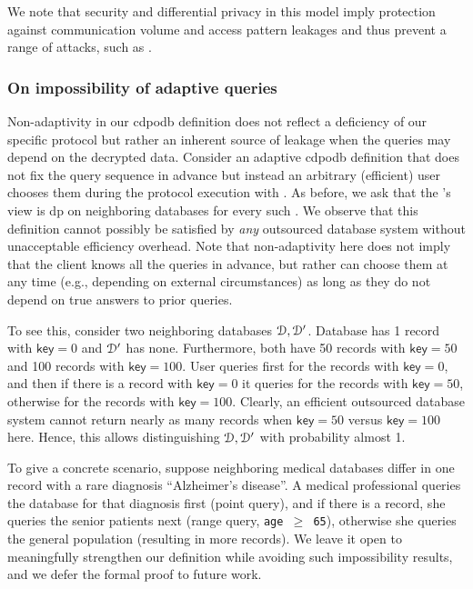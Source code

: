	\begin{remark}[Informal]
		We note that security and differential privacy in this model imply protection against communication volume and access pattern leakages and thus prevent a range of attacks, such as \cite{leakage-abuse-attacks-cash-15,inference-attacks-naveed-15,generic-attacks-kellaris}. %
	\end{remark}

	\subsubsection{On impossibility of adaptive queries}\label{section:dpodb:adversarial-models:adaptive}

		Non-adaptivity in our \acrshort{cdpodb} definition does not reflect a deficiency of our specific protocol but rather an inherent source of leakage when the queries may depend on the decrypted data.
		Consider an adaptive \acrshort{cdpodb} definition that does not fix the query sequence  in advance but instead an arbitrary (efficient) user \user{} chooses them during the protocol execution with \server{}.
		As before, we ask that the \server{}'s view is \acrshort{dp} on neighboring databases for every such \user{}.
		We observe that this definition cannot possibly be satisfied by \emph{any} outsourced database system without unacceptable efficiency overhead.
		Note that non-adaptivity here does not imply that the client knows all the queries in advance, but rather can choose them at any time (e.g., depending on external circumstances) as long as they do not depend on true answers to prior queries.

		To see this, consider two neighboring databases $\mathcal{D}, \mathcal{D}^\prime$.
		Database \database{} has 1 record with $\mathsf{key} = 0$ and $\mathcal{D}^\prime$ has none.
		Furthermore, both have 50 records with $\mathsf{key} = 50$ and 100 records with $\mathsf{key} = 100$.
		User \user{} queries first for the records with $\mathsf{key} = 0$, and then if there is a record with $\mathsf{key} = 0$ it queries for the records with $\mathsf{key} = 50$, otherwise for the records with $\mathsf{key} = 100$.
		Clearly, an efficient outsourced database system cannot return nearly as many records when $\mathsf{key} = 50$ versus $\mathsf{key} = 100$ here.
		Hence, this allows distinguishing $\mathcal{D}, \mathcal{D}^\prime$ with probability almost 1.

		To give a concrete scenario, suppose neighboring medical databases differ in one record with a rare diagnosis ``Alzheimer's disease''.
		A medical professional queries the database for that diagnosis first (point query), and if there is a record, she queries the senior patients next (range query, \texttt{age $\ge$ 65}), otherwise she queries the general population (resulting in more records).
		We leave it open to meaningfully strengthen our definition while avoiding such impossibility results, and we defer the formal proof to future work.

